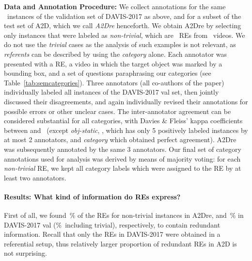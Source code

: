 \documentclass[10pt,twocolumn,letterpaper]{article}
\begin{document}
\noindent
\textbf{Data and Annotation Procedure:}
We collect annotations for the same ~instances of the validation set of DAVIS-2017 as above, and for a subset of the test set of A2D, which we call \textit{A2Dre} henceforth. 
We obtain A2Dre by selecting only instances that were labeled as \textsl{non-trivial}, which are ~REs from ~videos. We do not use the \textit{trivial} cases as the analysis of such examples is not relevant, as \textit{referents} can be described by using the \textit{category} alone. Each annotator was presented with a RE, a video in which the target object was marked by a bounding box, and a set of questions paraphrasing our categories (see Table~\ref{tab:semcategories}).
Three annotators (all co-authors of the paper) individually labeled all instances of the DAVIS-2017 val set, then jointly discussed their disagreements, and again individually revised their annotations for possible errors or other unclear cases. 
The inter-annotator agreement can be considered substantial for all categories, with Davies \& Fleiss' kappa coefficients \cite{davies1982kappa} between \mbox{} and~ (except \textsl{obj-static}, \mbox{}, which has only 5 positively labeled instances by at most 2 annotators, and \textsl{category} which obtained perfect agreement). A2Dre was subsequently annotated by the same 3 annotators. Our final set of category annotations used for analysis was derived by means of majority voting: for each \textsl{non-trivial} RE, we kept all category labels which were assigned to the RE by at least two annotators. 


















\paragraph{Results: What kind of information do REs express?}
First of all, we found~\% of the REs for non-trivial instances in A2Dre, and~\% in DAVIS-2017 val (\%~including trivial), respectively, to contain redundant information.
Recall that only the REs in DAVIS-2017 were obtained in a referential setup, thus relatively larger proportion of redundant REs in A2D is not surprising. 
\end{document}

